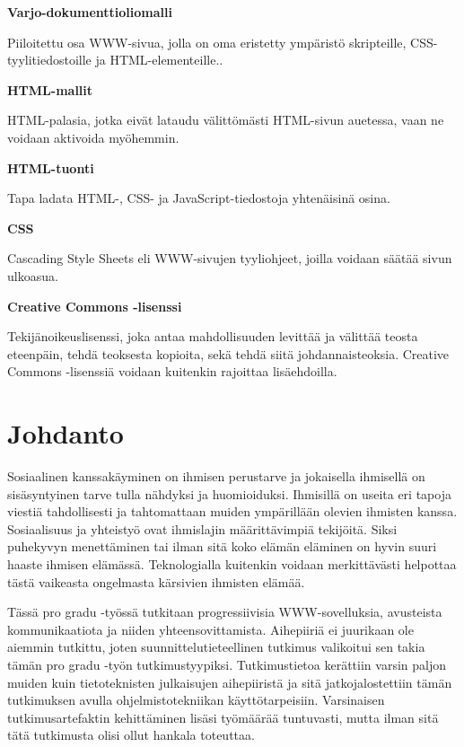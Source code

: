 \documentclass[utf8]{gradu3}
\begin{document}
\begin{thetermlist}
\item[\textbf{Varjo-dokumenttioliomalli}] 

Piiloitettu osa WWW-sivua, jolla on oma eristetty ympäristö skripteille, CSS-tyylitiedostoille ja HTML-elementeille..

\item[\textbf{HTML-mallit}] 

HTML-palasia, jotka eivät lataudu välittömästi HTML-sivun auetessa, vaan ne voidaan aktivoida myöhemmin.

\item[\textbf{HTML-tuonti}] 

Tapa ladata HTML-, CSS- ja JavaScript-tiedostoja yhtenäisinä osina.

\item[\textbf{CSS}] 

Cascading Style Sheets eli WWW-sivujen tyyliohjeet, joilla voidaan säätää sivun ulkoasua. 

\item[\textbf{Creative Commons -lisenssi}] 

Tekijänoikeuslisenssi, joka antaa mahdollisuuden levittää ja välittää teosta eteenpäin, tehdä teoksesta kopioita, sekä tehdä siitä johdannaisteoksia. Creative Commons -lisenssiä voidaan kuitenkin rajoittaa lisäehdoilla.

\end{thetermlist}

\mainmatter

\chapter{Johdanto}

Sosiaalinen kanssakäyminen on ihmisen perustarve ja jokaisella ihmisellä on sisäsyntyinen tarve tulla nähdyksi ja huomioiduksi. Ihmisillä on useita eri tapoja viestiä tahdollisesti ja tahtomattaan muiden ympärillään olevien ihmisten kanssa. Sosiaalisuus ja yhteistyö ovat ihmislajin määrittävimpiä tekijöitä. Siksi puhekyvyn menettäminen tai ilman sitä koko elämän eläminen on hyvin suuri haaste ihmisen elämässä. Teknologialla kuitenkin voidaan merkittävästi helpottaa tästä vaikeasta ongelmasta kärsivien ihmisten elämää.

Tässä pro gradu -työssä tutkitaan progressiivisia WWW-sovelluksia, avusteista kommunikaatiota ja niiden yhteensovittamista. Aihepiiriä ei juurikaan ole aiemmin tutkittu, joten suunnittelutieteellinen tutkimus valikoitui sen takia tämän pro gradu -työn tutkimustyypiksi. Tutkimustietoa kerättiin varsin paljon muiden kuin tietoteknisten julkaisujen aihepiiristä ja sitä jatkojalostettiin tämän tutkimuksen avulla ohjelmistotekniikan käyttötarpeisiin. Varsinaisen tutkimusartefaktin kehittäminen lisäsi työmäärää tuntuvasti, mutta ilman sitä tätä tutkimusta olisi ollut hankala toteuttaa.
\end{document}
